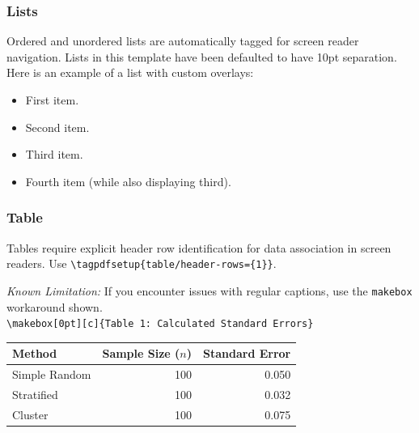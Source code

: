 \documentclass{ltx-talk}
\begin{document}
	\begin{frame}
		\frametitle{Lists}
		Ordered and unordered lists are automatically tagged for screen reader navigation.  Lists in this template have been defaulted to have 10pt separation. Here is an example of a list with custom overlays:
		\begin{itemize}
			\item<1-4> First item.
			\item<2-4> Second item.
			\item<3-4> Third item.
			\item<4> Fourth item (while also displaying third).
		\end{itemize}
	\end{frame}
	
	\begin{frame*}
		\frametitle{Table}
		Tables require explicit header row identification for data association in screen readers. Use \verb|\tagpdfsetup{table/header-rows={1}}|.
		\vspace{0.5cm}
		
		\textit{Known Limitation:} If you encounter issues with regular captions, use the \texttt{makebox} workaround shown.\\ \verb|\makebox[0pt][c]{Table 1: Calculated Standard Errors}|
		\vspace{0.5cm}
		
		
		\begin{table}
			\centering
			\begin{tabular}{lrr}
				\toprule
				\textbf{Method} & \textbf{Sample Size ($n$)} & \textbf{Standard Error} \\
				\midrule
				Simple Random   & 100                        & 0.050                  \\
				Stratified      & 100                        & 0.032                  \\
				Cluster         & 100                        & 0.075                  \\
				\bottomrule
			\end{tabular}
            
		\end{table}
	\end{frame*}
	
\end{document}
